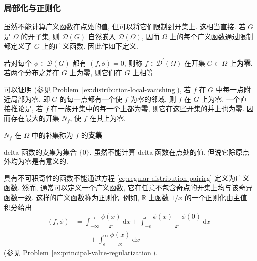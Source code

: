 \subsubsection{局部化与正则化}\label{subsec:distribution-localization}

虽然不能计算广义函数在点处的值, 但可以将它们限制到开集上. 这相当直接. 若 $G$ 是 $\Omega$ 的开子集, 则 $\mathcal{D}(G)$ 自然嵌入 $\mathcal{D}(\Omega)$, 因而 $\Omega$ 上的每个广义函数通过限制都定义了 $G$ 上的广义函数. 因此作如下定义.

\begin{Definition}
\label{def:distribution-vanishing}
若对每个 $\phi\in\mathcal{D}(G)$ 都有 $(f,\phi)=0$, 则称 $f\in\mathcal{D}^{\prime}(\Omega)$ 在开集 $G\subset\Omega$ 上\textbf{为零}. 若两个分布之差在 $G$ 上为零, 则它们在 $G$ 上相等.
\end{Definition}

可以证明 (参见 Problem~\ref{ex:distribution-local-vanishing}), 若 $f$ 在 $G$ 中每一点附近局部为零, 即 $G$ 的每一点都有一个使 $f$ 为零的邻域, 则 $f$ 在 $G$ 上为零. 一个直接推论是, 若 $f$ 在一族开集中的每一个上都为零, 则它在这些开集的并上也为零. 因而存在最大的开集 $N_f$, 使 $f$ 在其上为零.

\begin{Definition}
\label{def:distribution-support}
$N_f$ 在 $\Omega$ 中的补集称为 $f$ 的\textbf{支集}.
\end{Definition}

\begin{Example}
\label{ex:delta-support}
delta 函数的支集为集合 $\{0\}$. 虽然不能计算 delta 函数在点处的值, 但说它除原点外均为零是有意义的.
\end{Example}

\begin{Remark}
\label{rem:singular-function-regularization}
具有不可积奇性的函数不能通过方程 \eqref{eq:regular-distribution-pairing} 定义为广义函数. 然而, 通常可以定义一个广义函数, 它在任意不包含奇点的开集上均与该奇异函数一致. 这样的广义函数称为正则化. 例如, $\mathbb{R}$ 上函数 $1/x$ 的一个正则化由主值积分给出
\begin{equation}\label{eq:principal-value-one-over-x-regularization}
\begin{aligned}
(f,\phi)&=\int_{-\infty}^{-\epsilon}\dfrac{\phi(x)}x\,\mathrm{d}x
+\int_{-\epsilon}^{\epsilon}\dfrac{\phi(x)-\phi(0)}x\,\mathrm{d}x\\
&\qquad+\int_\epsilon^\infty\dfrac{\phi(x)}x\,\mathrm{d}x
\end{aligned}
\end{equation}
(参见 Problem~\ref{ex:principal-value-regularization}).
\end{Remark}
